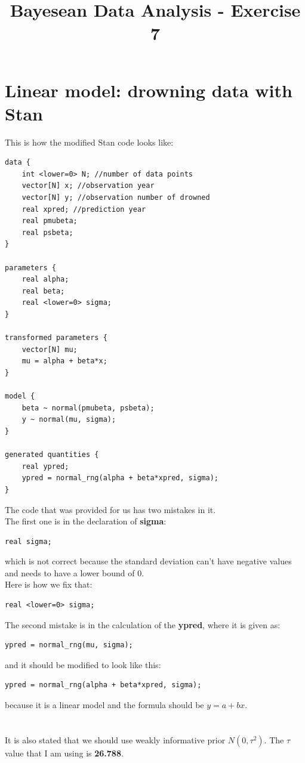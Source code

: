 \documentclass[17pt]{article}
\begin{document}
\title{{Bayesean Data Analysis - Exercise 7}}
\maketitle


\section{Linear model: drowning data with Stan}
This is how the modified Stan code looks like: \\
\begin{lstlisting}
data {
    int <lower=0> N; //number of data points
    vector[N] x; //observation year
    vector[N] y; //observation number of drowned
    real xpred; //prediction year
    real pmubeta;
    real psbeta;
}

parameters {
    real alpha;
    real beta;
    real <lower=0> sigma;
}

transformed parameters {
    vector[N] mu;
    mu = alpha + beta*x;
}

model {
    beta ~ normal(pmubeta, psbeta);
    y ~ normal(mu, sigma);
}

generated quantities {
    real ypred;
    ypred = normal_rng(alpha + beta*xpred, sigma);
}
\end{lstlisting}

The code that was provided for us has two mistakes in it. \\
The first one is in the declaration of \textbf{sigma}: \\
\begin{lstlisting}
real sigma;
\end{lstlisting}
which is not correct because the standard deviation can't have negative values and needs to have a lower bound of 0. \\
Here is how we fix that: \\
\begin{lstlisting}
real <lower=0> sigma;
\end{lstlisting}
The second mistake is in the calculation of the \textbf{ypred}, where it is given as: \\
\begin{lstlisting}
ypred = normal_rng(mu, sigma);
\end{lstlisting}
and it should be modified to look like this: \\
\begin{lstlisting}
ypred = normal_rng(alpha + beta*xpred, sigma);
\end{lstlisting}
because it is a linear model and the formula should be $ y = a + bx$.
\\~\\~\\
It is also stated that we should use weakly informative prior $N(0, \tau^2)$.
The $\tau$ value that I am using is \textbf{26.788}.
\end{document}
